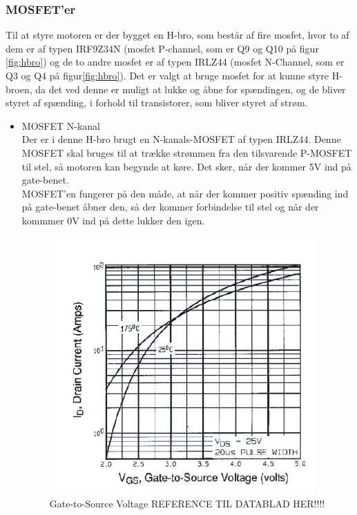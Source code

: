 \subsubsection{MOSFET'er}
Til at styre motoren er der bygget en H-bro, som består af fire mosfet, hvor to af dem er af typen IRF9Z34N (mosfet P-channel, som er Q9 og Q10 på figur \ref{fig:hbro}) og de to andre mosfet er af typen IRLZ44 (mosfet N-Channel, som er Q3 og Q4 på figur\ref{fig:hbro}). Det er valgt at bruge mosfet for at kunne styre H-broen, da det ved denne er muligt at lukke og åbne for spændingen, og de bliver styret af spænding, i forhold til transistorer, som bliver styret af strøm. 

\begin{itemize}
\item MOSFET N-kanal\\
	Der er i denne H-bro brugt en N-kanals-MOSFET af typen IRLZ44. Denne MOSFET skal bruges til at trække strømmen fra den tilsvarende P-MOSFET til stel, så motoren kan begynde at køre. Det sker, når der kommer 5V ind på gate-benet. 
	\\MOSFET'en fungerer på den måde, at når der kommer positiv spænding ind på gate-benet åbner den, så der kommer forbindelse til stel og når der kommmer 0V ind på dette lukker den igen. 
	
	\begin{figure}[H]
		\centering
		\includegraphics[width=\textwidth]{DesignOgImplementering/images/grafn}
		\caption{Gate-to-Source Voltage REFERENCE TIL DATABLAD HER!!!!}
		\label{fig:mosfetn}
	\end{figure}
	

\end{itemize}

